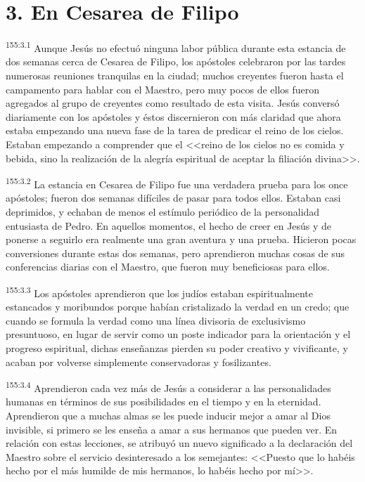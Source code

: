 \section*{3. En Cesarea de Filipo}
\par 
\textsuperscript{155:3.1} Aunque Jesús no efectuó ninguna labor pública durante esta estancia de dos semanas cerca de Cesarea de Filipo, los apóstoles celebraron por las tardes numerosas reuniones tranquilas en la ciudad; muchos creyentes fueron hasta el campamento para hablar con el Maestro, pero muy pocos de ellos fueron agregados al grupo de creyentes como resultado de esta visita. Jesús conversó diariamente con los apóstoles y éstos discernieron con más claridad que ahora estaba empezando una nueva fase de la tarea de predicar el reino de los cielos. Estaban empezando a comprender que el <<reino de los cielos no es comida y bebida, sino la realización de la alegría espiritual de aceptar la filiación divina>>.

\par 
\textsuperscript{155:3.2} La estancia en Cesarea de Filipo fue una verdadera prueba para los once apóstoles; fueron dos semanas difíciles de pasar para todos ellos. Estaban casi deprimidos, y echaban de menos el estímulo periódico de la personalidad entusiasta de Pedro. En aquellos momentos, el hecho de creer en Jesús y de ponerse a seguirlo era realmente una gran aventura y una prueba. Hicieron pocas conversiones durante estas dos semanas, pero aprendieron muchas cosas de sus conferencias diarias con el Maestro, que fueron muy beneficiosas para ellos.

\par 
\textsuperscript{155:3.3} Los apóstoles aprendieron que los judíos estaban espiritualmente estancados y moribundos porque habían cristalizado la verdad en un credo; que cuando se formula la verdad como una línea divisoria de exclusivismo presuntuoso, en lugar de servir como un poste indicador para la orientación y el progreso espiritual, dichas enseñanzas pierden su poder creativo y vivificante, y acaban por volverse simplemente conservadoras y fosilizantes.

\par 
\textsuperscript{155:3.4} Aprendieron cada vez más de Jesús a considerar a las personalidades humanas en términos de sus posibilidades en el tiempo y en la eternidad. Aprendieron que a muchas almas se les puede inducir mejor a amar al Dios invisible, si primero se les enseña a amar a sus hermanos que pueden ver. En relación con estas lecciones, se atribuyó un nuevo significado a la declaración del Maestro sobre el servicio desinteresado a los semejantes: <<Puesto que lo habéis hecho por el más humilde de mis hermanos, lo habéis hecho por mí>>.

